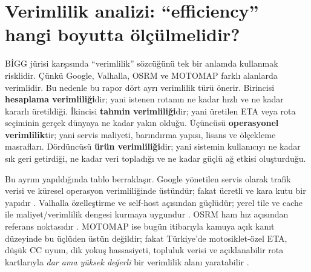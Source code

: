 \documentclass[11pt,a4paper]{article}
\begin{document}
\section{Verimlilik analizi: ``efficiency'' hangi boyutta ölçülmelidir?}

BİGG jürisi karşısında ``verimlilik'' sözcüğünü tek bir anlamda kullanmak risklidir. Çünkü Google, Valhalla, OSRM ve MOTOMAP farklı alanlarda verimlidir. Bu nedenle bu rapor dört ayrı verimlilik türü önerir. Birincisi \textbf{hesaplama verimliliği}dir; yani istenen rotanın ne kadar hızlı ve ne kadar kararlı üretildiği. İkincisi \textbf{tahmin verimliliği}dir; yani üretilen ETA veya rota seçiminin gerçek dünyaya ne kadar yakın olduğu. Üçüncüsü \textbf{operasyonel verimlilik}tir; yani servis maliyeti, barındırma yapısı, lisans ve ölçekleme masrafları. Dördüncüsü \textbf{ürün verimliliği}dir; yani sistemin kullanıcıyı ne kadar sık geri getirdiği, ne kadar veri topladığı ve ne kadar güçlü ağ etkisi oluşturduğu.

Bu ayrım yapıldığında tablo berraklaşır. Google yönetilen servis olarak trafik verisi ve küresel operasyon verimliliğinde üstündür; fakat ücretli ve kara kutu bir yapıdır \cite{o1,o4,o5}. Valhalla özelleştirme ve self-host açısından güçlüdür; yerel tile ve cache ile maliyet/verimlilik dengesi kurmaya uygundur \cite{o7,o8,o9,o12}. OSRM ham hız açısından referans noktasıdır \cite{o14}. MOTOMAP ise bugün itibarıyla kamuya açık kanıt düzeyinde bu üçlüden üstün değildir; fakat Türkiye'de motosiklet-özel ETA, düşük CC uyum, dik yokuş hassasiyeti, topluluk verisi ve açıklanabilir rota kartlarıyla \emph{dar ama yüksek değerli} bir verimlilik alanı yaratabilir \cite{u1,u2,g2,g6}. 
\end{document}
